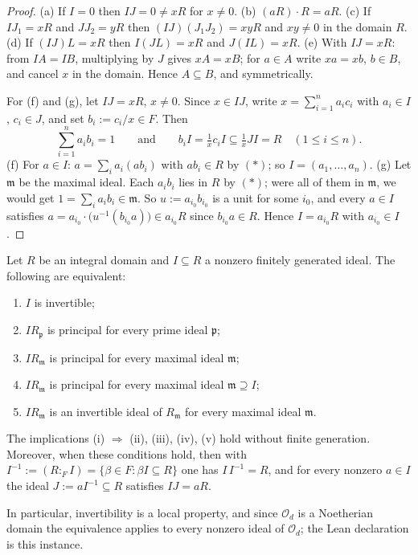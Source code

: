 \begin{proof}
  (a) If $I = 0$ then $IJ = 0 \neq xR$ for $x \neq 0$.
  (b) $(aR) \cdot R = aR$.
  (c) If $I J_1 = xR$ and $J J_2 = yR$ then
  $(IJ)(J_1 J_2) = xyR$ and $xy \neq 0$ in the domain $R$.
  (d) If $(IJ)L = xR$ then $I(JL) = xR$ and $J(IL) = xR$.
  (e) With $IJ = xR$: from $IA = IB$, multiplying by $J$ gives $xA = xB$;
  for $a \in A$ write $xa = xb$, $b \in B$, and cancel $x$ in the domain.
  Hence $A \subseteq B$, and symmetrically.

  For (f) and (g), let $IJ = xR$, $x \neq 0$. Since $x \in IJ$, write
  $x = \sum_{i=1}^n a_i c_i$ with $a_i \in I$, $c_i \in J$, and set
  $b_i := c_i / x \in F$. Then
  \[ \sum_{i=1}^n a_i b_i = 1
     \qquad\text{and}\qquad
     b_i I = \tfrac{1}{x} c_i I \subseteq \tfrac{1}{x} J I = R
     \quad (1 \leq i \leq n). \tag{$\ast$} \]
  (f) For $a \in I$: $a = \sum_i a_i (a b_i)$ with $a b_i \in R$ by $(\ast)$;
  so $I = (a_1, \dots, a_n)$.
  (g) Let $\mathfrak{m}$ be the maximal ideal. Each $a_i b_i$ lies in $R$ by
  $(\ast)$; were all of them in $\mathfrak{m}$, we would get
  $1 = \sum_i a_i b_i \in \mathfrak{m}$. So $u := a_{i_0} b_{i_0}$ is a unit
  for some $i_0$, and every $a \in I$ satisfies
  $a = a_{i_0} \cdot \bigl( u^{-1} (b_{i_0} a) \bigr) \in a_{i_0} R$
  since $b_{i_0} a \in R$. Hence $I = a_{i_0} R$ with $a_{i_0} \in I$.
\end{proof}

\begin{theorem}\label{infra-invertibility}
  Let $R$ be an integral domain and $I \subseteq R$ a nonzero finitely
  generated ideal. The following are equivalent:
  \begin{enumerate}
    \item[(i)] $I$ is invertible;
    \item[(ii)] $I R_{\mathfrak{p}}$ is principal for every prime ideal $\mathfrak{p}$;
    \item[(iii)] $I R_{\mathfrak{m}}$ is principal for every maximal ideal $\mathfrak{m}$;
    \item[(iv)] $I R_{\mathfrak{m}}$ is principal for every maximal ideal
      $\mathfrak{m} \supseteq I$;
    \item[(v)] $I R_{\mathfrak{m}}$ is an invertible ideal of $R_{\mathfrak{m}}$
      for every maximal ideal $\mathfrak{m}$.
  \end{enumerate}
  The implications (i) $\Rightarrow$ (ii), (iii), (iv), (v) hold without finite
  generation. Moreover, when these conditions hold, then with
  $I^{-1} := (R :_F I) = \{ \beta \in F : \beta I \subseteq R \}$ one has
  $I \, I^{-1} = R$, and for every nonzero $a \in I$ the ideal
  $J := a I^{-1} \subseteq R$ satisfies $I J = a R$.

  In particular, invertibility is a local property, and since $\mathcal{O}_d$
  is a Noetherian domain the equivalence applies to every nonzero ideal of
  $\mathcal{O}_d$; the Lean declaration is this instance.
\end{theorem}

